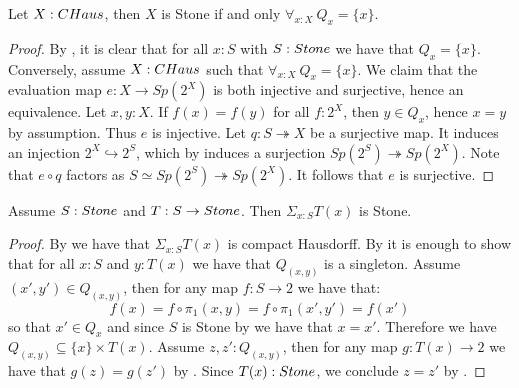 \begin{lemma}\label{StoneCompactHausdorffTotallyDisconnected}
Let $X:\CHaus$, then $X$ is Stone if and only $\forall_{x:X}\ Q_x=\{x\}$.
\end{lemma}

\begin{proof}
  By , it is clear that for all $x:S$ with $S:\Stone$ we have that $Q_x=\{x\}$.
%
  Conversely, assume $X:\CHaus$ such that $\forall_{x:X}\ Q_x = \{x\}$.
  We claim that the evaluation map $e:X \to Sp(2^X)$ is both injective and surjective, hence an equivalence. 
    Let $x,y:X$. If $f(x) = f(y)$ for all $f:2^X$, then $y \in Q_x$, hence $x=y$ by assumption. 
    Thus $e$ is injective. 
    Let $q:S\twoheadrightarrow X$ be a surjective map. 
    It induces an injection $2^X \hookrightarrow 2^S$, which by 
    induces a surjection $Sp(2^S) \twoheadrightarrow Sp(2^X)$. 
    Note that $e\circ q$ factors as $S\simeq Sp(2^S) \twoheadrightarrow Sp(2^X)$. 
    It follows that $e$ is surjective. 
%
%
%
\end{proof}

\begin{theorem}
  \label{stone-sigma-closed}
Assume $S:\Stone$ and $T:S\to\Stone$. Then $\Sigma_{x:S}T(x)$ is Stone.
\end{theorem}

\begin{proof}
By  we have that $\Sigma_{x:S}T(x)$ is compact Hausdorff. 
By  
it is enough to show that for all $x:S$ and $y:T(x)$ 
we have that $Q_{(x,y)}$ is a singleton.
%
Assume $(x',y')\in Q_{(x,y)}$, then for any map $f:S\to 2$ we have that:
$$ f(x) = f\circ \pi_1(x,y) = f\circ \pi_1(x',y') = f(x')$$
so that $x'\in Q_x$ and since $S$ is Stone by  we have that $x=x'$.
%
Therefore we have $Q_{(x,y)}\subseteq \{x\}\times T(x)$. Assume $z,z':Q_{(x,y)}$, then for any map $g:T(x)\to 2$ we have that $g(z)=g(z')$ by . Since $T(x):\Stone$, we conclude $z=z'$ by .
\end{proof}


